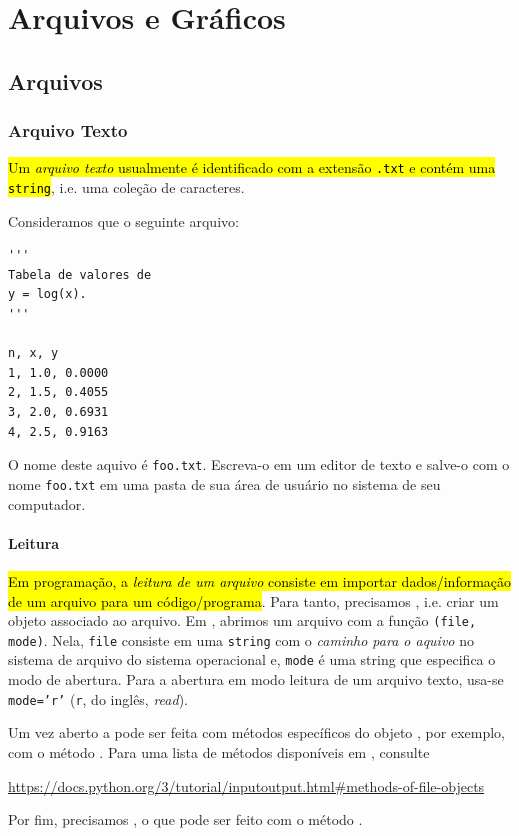 

\chapter{Arquivos e Gráficos}\label{cap_ag}

\section{Arquivos}\label{cap_ag_sec_arq}

\subsection{Arquivo Texto}

\hl{Um \emph{arquivo texto} usualmente é identificado com a extensão \texttt{.txt} e contém uma \texttt{string}}, i.e. uma coleção de caracteres. 

Consideramos que o seguinte arquivo:

\begin{lstlisting}[caption = foo.txt, label=cap_ag_sec_arq:cod:foo.txt]
'''
Tabela de valores de
y = log(x).
'''

n, x, y
1, 1.0, 0.0000
2, 1.5, 0.4055
3, 2.0, 0.6931
4, 2.5, 0.9163
\end{lstlisting}

O nome deste aquivo é \texttt{foo.txt}. Escreva-o em um editor de texto e salve-o com o nome \texttt{foo.txt} em uma pasta de sua área de usuário no sistema de seu computador.

\subsubsection{Leitura}

\hl{Em programação, a \emph{leitura de um arquivo} consiste em importar dados/informação de um arquivo para um código/programa}. Para tanto, precisamos , i.e. criar um objeto {\PYTHONfile} associado ao arquivo. Em {\python}, abrimos um arquivo com a função {\PYTHONopen}\texttt{(file, mode)}. Nela, \texttt{file} consiste em uma \lstinline+string+ com o \emph{caminho para o aquivo} no sistema de arquivo do sistema operacional e, \texttt{mode} é uma string que especifica o modo de abertura. Para a abertura em modo leitura de um arquivo texto, usa-se \texttt{mode='r'} (\texttt{r}, do inglês, \textit{read}).

Um vez aberto a  pode ser feita com métodos específicos do objeto {\PYTHONfile}, por exemplo, com o método {\PYTHONfileDOTread}. Para uma lista de métodos disponíveis em {\python}, consulte
\begin{center}
  \url{https://docs.python.org/3/tutorial/inputoutput.html#methods-of-file-objects}
\end{center}
Por fim, precisamos , o que pode ser feito com o método {\PYTHONfileDOTclose}.

